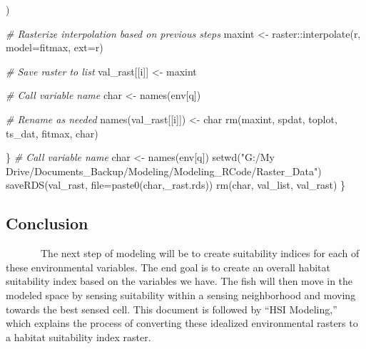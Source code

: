 \documentclass[
]{article}
\newenvironment{Shaded}{\begin{snugshade}}{\end{snugshade}}
\newcommand{\AttributeTok}[1]{\textcolor[rgb]{0.77,0.63,0.00}{#1}}
\newcommand{\CommentTok}[1]{\textcolor[rgb]{0.56,0.35,0.01}{\textit{#1}}}
\newcommand{\FunctionTok}[1]{\textcolor[rgb]{0.00,0.00,0.00}{#1}}
\newcommand{\NormalTok}[1]{#1}
\newcommand{\OtherTok}[1]{\textcolor[rgb]{0.56,0.35,0.01}{#1}}
\newcommand{\SpecialCharTok}[1]{\textcolor[rgb]{0.00,0.00,0.00}{#1}}
\newcommand{\StringTok}[1]{\textcolor[rgb]{0.31,0.60,0.02}{#1}}
\begin{document}
\begin{Shaded}
\begin{Highlighting}[]
\NormalTok{    )}
    
    \CommentTok{\# Rasterize interpolation based on previous steps}
\NormalTok{    maxint }\OtherTok{\textless{}{-}}\NormalTok{ raster}\SpecialCharTok{::}\FunctionTok{interpolate}\NormalTok{(r, }\AttributeTok{model=}\NormalTok{fitmax, }\AttributeTok{ext=}\NormalTok{r)}
    
    \CommentTok{\# Save raster to list}
\NormalTok{    val\_rast[[i]] }\OtherTok{\textless{}{-}}\NormalTok{ maxint}
    
    \CommentTok{\# Call variable name}
\NormalTok{    char }\OtherTok{\textless{}{-}} \FunctionTok{names}\NormalTok{(env[q])}
    
    \CommentTok{\# Rename as needed}
    \FunctionTok{names}\NormalTok{(val\_rast[[i]]) }\OtherTok{\textless{}{-}}\NormalTok{ char}
    \FunctionTok{rm}\NormalTok{(maxint, spdat, toplot, ts\_dat, fitmax, char)}
    
\NormalTok{  \}}
  \CommentTok{\# Call variable name}
\NormalTok{  char }\OtherTok{\textless{}{-}} \FunctionTok{names}\NormalTok{(env[q])}
  \FunctionTok{setwd}\NormalTok{(}\StringTok{"G:/My Drive/Documents\_Backup/Modeling/Modeling\_RCode/Raster\_Data"}\NormalTok{)}
  \FunctionTok{saveRDS}\NormalTok{(val\_rast, }\AttributeTok{file=}\FunctionTok{paste0}\NormalTok{(char,}\StringTok{\textquotesingle{}\_rast.rds\textquotesingle{}}\NormalTok{))}
  \FunctionTok{rm}\NormalTok{(char, val\_list, val\_rast)}
\NormalTok{\}}
\end{Highlighting}
\end{Shaded}

\newpage
\onehalfspacing

\hypertarget{conclusion}{%
\subsection{Conclusion}\label{conclusion}}

~~~~~~~The next step of modeling will be to create suitability indices
for each of these environmental variables. The end goal is to create an
overall habitat suitability index based on the variables we have. The
fish will then move in the modeled space by sensing suitability within a
sensing neighborhood and moving towards the best sensed cell. This
document is followed by ``HSI Modeling,'' which explains the process of
converting these idealized environmental rasters to a habitat
suitability index raster.
\end{document}

